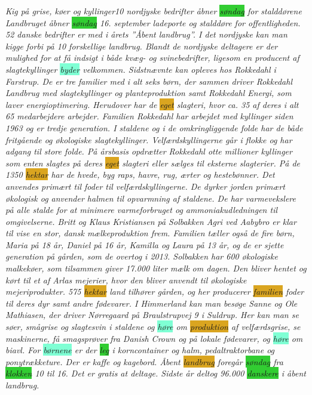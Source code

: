 \emph{
Kig på grise, køer og kyllinger10 \colorbox{Peach}{nordjyske} bedrifter åbner \colorbox{LimeGreen}{søndag} for stalddørene Landbruget åbner \colorbox{LimeGreen}{søndag} 16. \colorbox{Peach}{september} ladeporte og stalddøre for offentligheden. 52 danske bedrifter er med i årets ”Åbent landbrug”. I det \colorbox{Peach}{nordjyske} kan man kigge forbi på 10 \colorbox{Peach}{forskellige} landbrug. Blandt de \colorbox{Peach}{nordjyske} deltagere er der \colorbox{Peach}{mulighed} for at få indsigt i både kvæg- og svinebedrifter, \colorbox{Peach}{ligesom} en producent af slagtekyllinger \colorbox{Aquamarine}{byder} velkommen. Sidstnævnte kan opleves hos Rokkedahl i Farstrup. De er tre familier med i alt \colorbox{Peach}{seks} børn, der sammen driver Rokkedahl Landbrug med slagtekyllinger og planteproduktion \colorbox{Peach}{samt} Rokkedahl Energi, som laver energioptimering. Herudover har de \colorbox{Goldenrod}{eget} slagteri, hvor ca. 35 af deres i alt 65 \colorbox{Peach}{medarbejdere} arbejder. Familien Rokkedahl har \colorbox{Peach}{arbejdet} med kyllinger siden 1963 og er tredje generation. I staldene og i de omkringliggende folde har de både fritgående og økologiske slagtekyllinger. Velfærdskyllingerne går i flokke og har adgang til store folde. På årsbasis opdrætter Rokkedahl \colorbox{Peach}{otte} \colorbox{Peach}{millioner} kyllinger som enten slagtes på deres \colorbox{Goldenrod}{eget} slagteri eller sælges til eksterne slagterier. På de 1350 \colorbox{Goldenrod}{hektar} har de hvede, byg raps, havre, rug, ærter og hestebønner. Det anvendes primært til foder til velfærdskyllingerne. De dyrker \colorbox{Peach}{jorden} primært økologisk og anvender halmen til opvarmning af staldene. De har varmevekslere på alle stalde for at minimere varmeforbruget og ammoniakudledningen til omgivelserne. Britt og Klaus Kristiansen på Solbakken Agri ved Aabybro er \colorbox{Peach}{klar} til vise en stor, \colorbox{Peach}{dansk} mælkeproduktion frem. Familien tæller også de fire børn, Maria på 18 år, Daniel på 16 år, Kamilla og Laura på 13 år, og de er sjette generation på gården, som de overtog i 2013. Solbakken har 600 økologiske malkekøer, som tilsammen \colorbox{Peach}{giver} 17.000 liter mælk om dagen. Den bliver hentet og kørt til et af Arlas mejerier, hvor den bliver anvendt til økologiske mejeriprodukter. 575 \colorbox{Goldenrod}{hektar} \colorbox{Peach}{land} tilhører gården, og her producerer \colorbox{Goldenrod}{familien} foder til deres \colorbox{Peach}{dyr} \colorbox{Peach}{samt} andre fødevarer.  I Himmerland kan man besøge Sanne og Ole Mathiasen, der driver Nørregaard på Braulstrupvej 9 i Suldrup. Her kan man se søer, smågrise og slagtesvin i staldene og \colorbox{Aquamarine}{høre} om \colorbox{Goldenrod}{produktion} af velfærdsgrise, se maskinerne, få smagsprøver fra Danish Crown og på \colorbox{Peach}{lokale} fødevarer, og \colorbox{Aquamarine}{høre} om biavl. For \colorbox{Aquamarine}{børnene} er der \colorbox{LimeGreen}{leg} i korncontainer og halm, pedaltraktorbane og ponytrækketure. Der er kaffe og kagebord. Åbent \colorbox{Goldenrod}{landbrug} foregår \colorbox{LimeGreen}{søndag} fra \colorbox{LimeGreen}{klokken} 10 til 16. Det er gratis at deltage. Sidste år deltog 96.000 \colorbox{LimeGreen}{danskere} i åbent landbrug.
}

